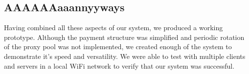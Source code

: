 \subsection{AAAAAAaaannyyways}

Having combined all these aspects of our system, we produced a working prototype. Although the payment structure was simplified and periodic rotation of the proxy pool was not implemented, we created enough of the system to demonstrate it's speed and versatility. We were able to test with multiple clients and servers in a local WiFi network to verify that our system was successful.